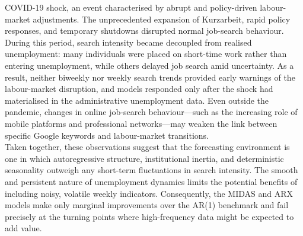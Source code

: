 \documentclass[12pt,a4paper]{article}
\begin{document}
COVID-19 shock, an event characterised by abrupt and policy-driven labour-market
adjustments. The unprecedented expansion of Kurzarbeit, rapid policy responses,
and temporary shutdowns disrupted normal job-search behaviour. During this
period, search intensity became decoupled from realised unemployment: many
individuals were placed on short-time work rather than entering unemployment,
while others delayed job search amid uncertainty. As a result, neither biweekly
nor weekly search trends provided early warnings of the labour-market disruption,
and models responded only after the shock had materialised in the administrative
unemployment data. Even outside the pandemic, changes in online job-search
behaviour—such as the increasing role of mobile platforms and professional
networks—may weaken the link between specific Google keywords and labour-market
transitions.\\
Taken together, these observations suggest that the forecasting environment is
one in which autoregressive structure, institutional inertia, and deterministic
seasonality outweigh any short-term fluctuations in search intensity. The smooth
and persistent nature of unemployment dynamics limits the potential benefits of
including noisy, volatile weekly indicators. Consequently, the MIDAS and ARX
models make only marginal improvements over the AR(1) benchmark and fail
precisely at the turning points where high-frequency data might be expected to
add value.
\end{document}
